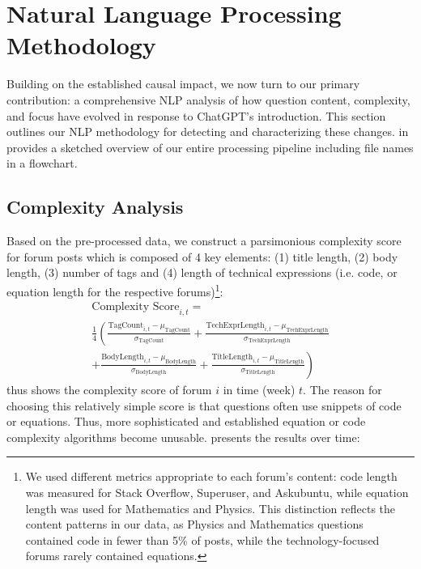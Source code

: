 \section{Natural Language Processing Methodology}
\label{sec:nlp_methodology}

Building on the established causal impact, we now turn to our primary contribution: a comprehensive NLP analysis of how question content, complexity, and focus have evolved in response to ChatGPT's introduction. This section outlines our NLP methodology for detecting and characterizing these changes.  in  provides a sketched overview of our entire processing pipeline including file names in a flowchart.


\subsection{Complexity Analysis}\label{subsec:comp}

Based on the pre-processed data, we construct a parsimonious complexity score for forum posts which is composed of 4 key elements: (1) title length, (2) body length, (3) number of tags and (4) length of technical expressions (i.e. code, or equation length for the respective forums)\footnote{We used different metrics appropriate to each forum's content: code length was measured for Stack Overflow, Superuser, and Askubuntu, while equation length was used for Mathematics and Physics. This distinction reflects the content patterns in our data, as Physics and Mathematics questions contained code in fewer than 5\% of posts, while the technology-focused forums rarely contained equations.}:
\begin{multline}\label{eq:cscore}
    \text{Complexity Score}_{i,t} = \\ 
    \frac{1}{4} \left( \frac{\text{TagCount}_{i,t} - \mu_{\text{TagCount}}}{\sigma_{\text{TagCount}}} + \frac{\text{TechExprLength}_{i,t} - \mu_{\text{TechExprLength}}}{\sigma_{\text{TechExprLength}}} \right. \\
    \left. + \frac{\text{BodyLength}_{i,t} - \mu_{\text{BodyLength}}}{\sigma_{\text{BodyLength}}} + \frac{\text{TitleLength}_{i,t} - \mu_{\text{TitleLength}}}{\sigma_{\text{TitleLength}}} \right)
\end{multline}
 thus shows the complexity score of forum $i$ in time (week) $t$. The reason for choosing this relatively simple score is that questions often use snippets of code or equations. Thus, more sophisticated and established equation or code complexity algorithms become unusable.  presents the results over time:

